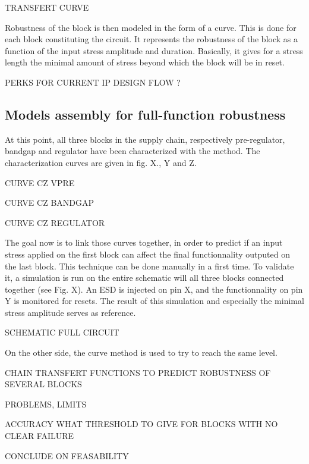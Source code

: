 TRANSFERT CURVE

Robustness of the block is then modeled in the form of a curve.
This is done for each block constituting the circuit.
It represents the robustness of the block as a function of the input stress amplitude and duration.
Basically, it gives for a stress length the minimal amount of stress beyond which the block will be in reset.

PERKS FOR CURRENT IP DESIGN FLOW ?

\subsection{Models assembly for full-function robustness}

At this point, all three blocks in the supply chain, respectively pre-regulator, bandgap and regulator have been characterized with the method.
The characterization curves are given in fig. X., Y and Z.

CURVE CZ VPRE

CURVE CZ BANDGAP

CURVE CZ REGULATOR

The goal now is to link those curves together, in order to predict if an input stress applied on the first block can affect the final functionnality outputed on the last block.
This technique can be done manually in a first time.
To validate it, a simulation is run on the entire schematic will all three blocks connected together (see Fig. X).
An ESD is injected on pin X, and the functionnality on pin Y is monitored for resets.
The result of this simulation and especially the minimal stress amplitude serves as reference.

SCHEMATIC FULL CIRCUIT

On the other side, the curve method is used to try to reach the same level.



CHAIN TRANSFERT FUNCTIONS TO PREDICT ROBUSTNESS OF SEVERAL BLOCKS

PROBLEMS, LIMITS

ACCURACY
WHAT THRESHOLD TO GIVE FOR BLOCKS WITH NO CLEAR FAILURE

CONCLUDE ON FEASABILITY
